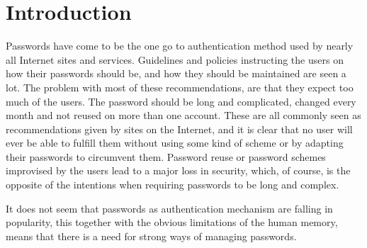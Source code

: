 \chapter{Introduction}
\label{chp:intro} 

Passwords have come to be the one go to authentication method used by nearly all Internet sites and services. Guidelines and policies instructing the users on how their passwords should be, and how they should be maintained are seen a lot. The problem with most of these recommendations, are that they expect too much of the users. The password should be long and complicated, changed every month and not reused on more than one account. These are all commonly seen as recommendations given by sites on the Internet, and it is clear that no user will ever be able to fulfill them without using some kind of scheme or by adapting their passwords to circumvent them. Password reuse or password schemes improvised by the users lead to a major loss in security, which, of course, is the opposite of the intentions when requiring passwords to be long and complex.  
\par It does not seem that passwords as authentication mechanism are falling in popularity, this together with the obvious limitations of the human memory, means that there is a need for strong ways of managing passwords. 


